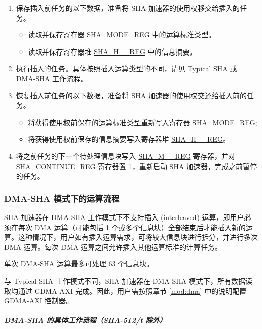 \documentclass[main\_\_CN.tex]{subfiles}
\begin{document}
\begin{enumerate}
    \item 保存插入前任务的以下数据，准备将 SHA 加速器的使用权移交给插入的任务。
        \begin{itemize}
            \item 读取并保存寄存器 \hyperref[regdesc:SHAMODEREG]{SHA\_MODE\_REG} 中的运算标准类型。
            \item 读取并保存寄存器堆 \hyperref[regdesc:SHAHNREG]{SHA\_H\_\_REG} 中的信息摘要。
        \end{itemize}
    \item 执行插入的任务。具体按照插入运算类型的不同，请见 \hyperref[sec:sha-typical-sha]{Typical SHA} 或 \hyperref[sec:sha-dma-sha]{DMA-SHA 工作流程}。
    \item 恢复插入前任务的以下数据，准备将 SHA 加速器的使用权交还给插入前的任务。
        \begin{itemize}
            \item 将获得使用权前保存的运算标准类型重新写入寄存器 \hyperref[regdesc:SHAMODEREG]{SHA\_MODE\_REG};
            \item 将获得使用权前保存的信息摘要写入寄存器堆 \hyperref[regdesc:SHAHNREG]{SHA\_H\_\_REG}。
        \end{itemize}
    \item 将之前任务的下一个待处理信息块写入 \hyperref[regdesc:SHAMNREG]{SHA\_M\_\_REG} 寄存器，并对 \hyperref[regdesc:SHACONTINUEREG]{SHA\_CONTINUE\_REG} 寄存器置 1，重新启动 SHA 加速器，完成之前暂停的任务。
\end{enumerate}


\subsubsection{DMA-SHA 模式下的运算流程}\label{sec:sha-dma-sha}

\chipname{} SHA 加速器在 DMA-SHA 工作模式下不支持插入 (interleaved) 运算，即用户必须在每次 DMA 运算（可能包括 1 个或多个信息块）全部结束后才能插入新的运算。这种情况下，用户如有插入运算需求，可将较大信息块进行拆分，并进行多次 DMA 运算。每次 DMA 运算之间允许插入其他运算标准的计算任务。

单次 DMA-SHA 运算最多可处理 63 个信息块。

与 Typical SHA 工作模式不同，SHA 加速器在 DMA-SHA 模式下，所有数据读取均通过 GDMA-AXI 完成。因此，用户需按照章节 \ref{mod:dma} \textit{} 中的说明配置 GDMA-AXI 控制器。

\subparagraph{DMA-SHA 的具体工作流程（SHA-512/{\it{t}} 除外）}
\end{document}
